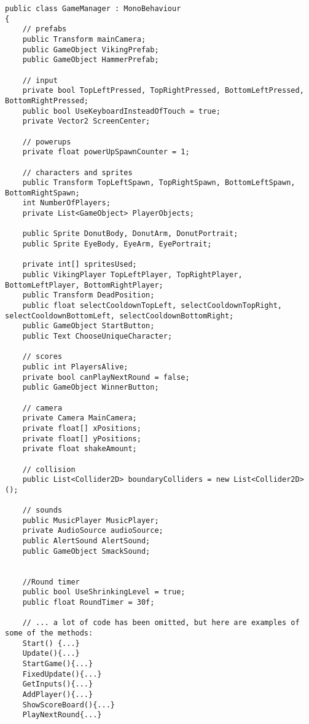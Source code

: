 \begin{lstlisting}
public class GameManager : MonoBehaviour
{
	// prefabs
	public Transform mainCamera;
	public GameObject VikingPrefab;
	public GameObject HammerPrefab;

	// input
	private bool TopLeftPressed, TopRightPressed, BottomLeftPressed, BottomRightPressed;
	public bool UseKeyboardInsteadOfTouch = true;
	private Vector2 ScreenCenter;

	// powerups
	private float powerUpSpawnCounter = 1;

	// characters and sprites
	public Transform TopLeftSpawn, TopRightSpawn, BottomLeftSpawn, BottomRightSpawn;
	int NumberOfPlayers;
	private List<GameObject> PlayerObjects;

	public Sprite DonutBody, DonutArm, DonutPortrait;
	public Sprite EyeBody, EyeArm, EyePortrait;

	private int[] spritesUsed;
	public VikingPlayer TopLeftPlayer, TopRightPlayer, BottomLeftPlayer, BottomRightPlayer;
	public Transform DeadPosition;
	public float selectCooldownTopLeft, selectCooldownTopRight, selectCooldownBottomLeft, selectCooldownBottomRight;
	public GameObject StartButton;
	public Text ChooseUniqueCharacter;
	
	// scores
	public int PlayersAlive;
	private bool canPlayNextRound = false;
	public GameObject WinnerButton;

	// camera
	private Camera MainCamera;
	private float[] xPositions;
	private float[] yPositions;
	private float shakeAmount;

	// collision
	public List<Collider2D> boundaryColliders = new List<Collider2D>();

	// sounds
	public MusicPlayer MusicPlayer;
	private AudioSource audioSource;
    public AlertSound AlertSound;
    public GameObject SmackSound;


    //Round timer
    public bool UseShrinkingLevel = true;
    public float RoundTimer = 30f;

	// ... a lot of code has been omitted, but here are examples of some of the methods:
	Start() {...}
	Update(){...}
	StartGame(){...}
	FixedUpdate(){...}
	GetInputs(){...}
	AddPlayer(){...}
	ShowScoreBoard(){...}
	PlayNextRound{...}
	
	
\end{lstlisting}